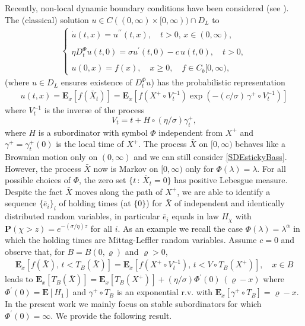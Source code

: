 \documentclass[[11pt,a4paper,reqno]{article}
\numberwithin{equation}{section}
\begin{document}
Recently, non-local dynamic boundary conditions have been considered (see \cite{DovSticky1}). The (classical) solution $u \in C((0, \infty) \times [0, \infty)) \cap D_L$ to
\begin{align}
\label{FBVP-realLine}
\left\lbrace
\begin{array}{ll}
\displaystyle \dot{u}(t,x) = u^{\prime \prime}(t,x), \quad t>0, \, x \in (0,\infty),\\
\\
\displaystyle \eta D^\Phi_t u(t,0) = \sigma u^\prime(t,0) - c\, u(t, 0), \quad t>0,\\
\\
\displaystyle u(0,x) = f(x), \quad x \geq 0, \quad f \in C_b[0, \infty),
\end{array}
\right.
\end{align}
(where $u \in D_L$ ensures existence of $D^\Phi_t u$) has the probabilistic representation
\begin{align*}
u(t,x) = \mathbf{E}_x [f(\bar{X}_t)] = \mathbf{E}_x\left[f(X^+ \circ V^{-1}_t) \exp \left( -(c/\sigma)\, \gamma^+ \circ V^{-1}_t \right) \right]
\end{align*}
where $V^{-1}_t$ is the inverse of the process 
$$V_t = t + H \circ (\eta/ \sigma) \gamma^+_t,$$
where $H$ is a subordinator with symbol $\Phi$ independent from $X^+$ and $\gamma^+=\gamma^+_t(0)$ is the local time of $X^+$. The process $\bar{X}$ on $[0, \infty)$ behaves like a Brownian motion only on $(0, \infty)$ and we can still consider \eqref{SDEstickyBass}. However, the process $\bar{X}$ now is Markov on $[0, \infty)$ only for $\Phi(\lambda)=\lambda$. For all possible choices of $\Phi$, the zero set $\{t\,:\, \bar{X}_t=0\}$ has positive Lebesgue measure. Despite the fact $\bar{X}$ moves along the path of $X^+$, we are able to identify a sequence $\{\bar{e}_i\}_i$ of holding times (at $\{0\}$) for $\bar{X}$ of independent and identically distributed random variables, in particular $\bar{e}_i$ equals in law $H_\chi$ with $\mathbf{P}(\chi > z) = e^{-(\sigma/\eta) z}$ for all $i$. As an example we recall the case $\Phi(\lambda)=\lambda^\alpha$ in which the holding times are Mittag-Leffler random variables. Assume $c=0$ and observe that, for $B=B(0, \varrho)$ and $\varrho>0$, 
\begin{align*}
    \mathbf{E}_x[f(\bar{X}), \, t < T_B(\bar{X})] =  \mathbf{E}_x[f(X^+ \circ V^{-1}_t), \, t < V \circ T_B(X^+)], \quad x \in B
\end{align*}
leads to $\mathbf{E}_x[T_B(\bar{X})] = \mathbf{E}_x[T_B(X^+)] + (\eta/\sigma) \Phi^\prime(0)\, (\varrho-x)$ where $\Phi^\prime(0) = \mathbf{E}[H_1]$ and $\gamma^+ \circ T_B$ is an exponential r.v. with $\mathbf{E}_x[\gamma^+ \circ T_B]=\varrho-x$. In the present work we mainly focus on stable subordinators for which $\Phi^\prime(0)=\infty$. We provide the following result.
\end{document}
